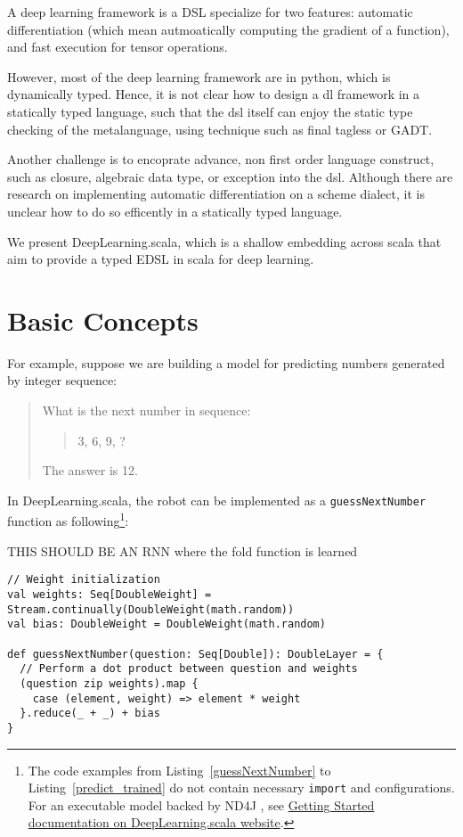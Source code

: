 A deep learning framework is a DSL specialize for two features: automatic differentiation (which mean autmoatically computing the gradient of a function), and fast execution for tensor operations.

However, most of the deep learning framework are in python, which is dynamically typed.
Hence, it is not clear how to design a dl framework in a statically typed language, such that the dsl itself can enjoy the static type checking of the metalanguage, using technique such as final tagless or GADT.

Another challenge is to encoprate advance, non first order language construct, such as closure, algebraic data type, or exception into the dsl. Although there are research on implementing automatic differentiation on a scheme dialect, it is unclear how to do so efficently in a statically typed language.

We present DeepLearning.scala, which is a shallow embedding across scala that aim to provide a typed EDSL in scala for deep learning.

\section{Basic Concepts}
\label{concepts}

For example, suppose we are building a model for predicting numbers generated by integer sequence:

\begin{quote}
  What is the next number in sequence:
    \begin{quote}
    3, 6, 9, ?
    \end{quote}
  The answer is 12.
\end{quote}

In DeepLearning.scala, the robot can be implemented as a \lstinline{guessNextNumber} function as following\footnote{The code examples from Listing~\ref{guessNextNumber} to Listing~\ref{predict_trained} do not contain necessary \lstinline{import} and configurations. For an executable model backed by ND4J \cite{skymind2017nd4j}, see \href{http://deeplearning.thoughtworks.school/demo/GettingStarted.html}{Getting Started documentation on DeepLearning.scala website}.}:

THIS SHOULD BE AN RNN where the fold function is learned
\begin{lstlisting}[float={h t b p},caption={The differentiable matrix multiplication implemented by \lstinline{map}/\lstinline{reduce}},label={guessNextNumber}]
// Weight initialization
val weights: Seq[DoubleWeight] = Stream.continually(DoubleWeight(math.random))
val bias: DoubleWeight = DoubleWeight(math.random)

def guessNextNumber(question: Seq[Double]): DoubleLayer = {
  // Perform a dot product between question and weights
  (question zip weights).map {
    case (element, weight) => element * weight
  }.reduce(_ + _) + bias
}
\end{lstlisting}

